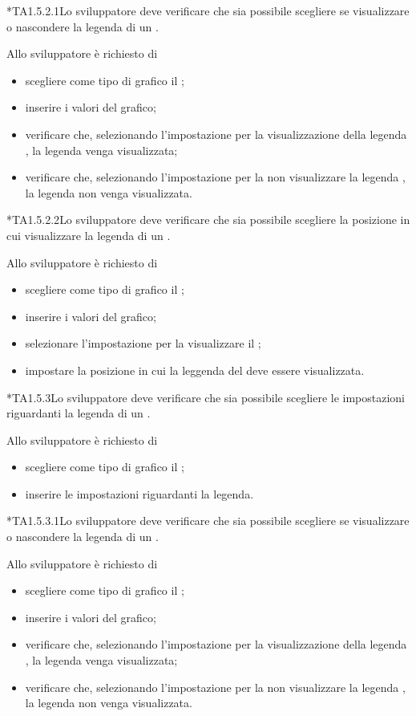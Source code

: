 	*{TA1.5.2.1}Lo sviluppatore deve verificare che sia possibile scegliere se visualizzare o nascondere la legenda di un .
		
		Allo sviluppatore è richiesto di
		\begin{itemize}
			\item scegliere come tipo di grafico il ;
			\item inserire i valori del grafico;
			\item verificare che, selezionando l'impostazione per la visualizzazione della legenda , la legenda venga visualizzata;
			\item verificare che, selezionando l'impostazione per la non visualizzare la legenda , la legenda non venga visualizzata.
		\end{itemize}

	*{TA1.5.2.2}Lo sviluppatore deve verificare che sia possibile scegliere la posizione in cui visualizzare la legenda di un .
			
		Allo sviluppatore è richiesto di
		\begin{itemize}
			\item scegliere come tipo di grafico il ;
			\item inserire i valori del grafico;
			\item selezionare l'impostazione per la visualizzare il ;
			\item impostare la posizione in cui la leggenda del  deve essere visualizzata.
		\end{itemize}

	*{TA1.5.3}Lo sviluppatore deve verificare che sia possibile scegliere le impostazioni riguardanti la legenda di un .

		Allo sviluppatore è richiesto di
		\begin{itemize}
			\item scegliere come tipo di grafico il ;
			\item inserire le impostazioni riguardanti la legenda.
		\end{itemize}

	*{TA1.5.3.1}Lo sviluppatore deve verificare che sia possibile scegliere se visualizzare o nascondere la legenda di un .
			
		Allo sviluppatore è richiesto di
		\begin{itemize}
			\item scegliere come tipo di grafico il ;
			\item inserire i valori del grafico;
			\item verificare che, selezionando l'impostazione per la visualizzazione della legenda , la legenda venga visualizzata;
			\item verificare che, selezionando l'impostazione per la non visualizzare la legenda , la legenda non venga visualizzata.
		\end{itemize}

